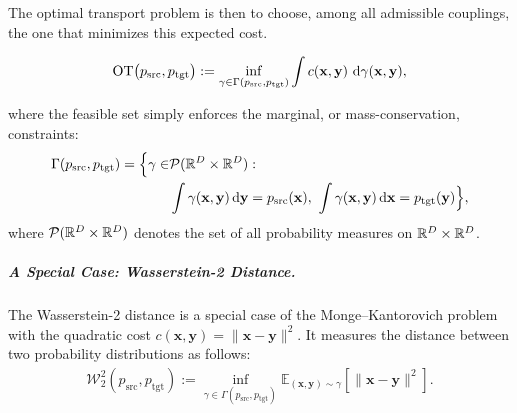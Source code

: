 The optimal transport problem is then to choose, among all admissible couplings,
the one that minimizes this expected cost.
\begin{mdframed}
\begin{equation}\label{eq:ot}
\mathrm{OT}\big(p_{\mathrm{src}},p_{\mathrm{tgt}}\big)
:= \inf_{\gamma\in\Gamma(p_{\mathrm{src}},p_{\mathrm{tgt}})}
\int c({\mathbf{x}},{\mathbf{y}})\,\mathop{}\!\mathrm{d}\gamma({\mathbf{x}},{\mathbf{y}}),
\end{equation}
\end{mdframed}
where the feasible set simply enforces the marginal, or mass-conservation, constraints:
\begin{align*}
    \Gamma(p_{\mathrm{src}},p_{\mathrm{tgt}})
= \Big\{\gamma \in &\mathcal{P}(\mathbb{R}^D\times\mathbb{R}^D): \\
&\int \gamma({\mathbf{x}},{\mathbf{y}}) \mathop{}\!\mathrm{d} {\mathbf{y}} = p_{\mathrm{src}}({\mathbf{x}}),\,\,
\int \gamma({\mathbf{x}},{\mathbf{y}})\mathop{}\!\mathrm{d} {\mathbf{x}} = p_{\mathrm{tgt}}({\mathbf{y}})\Big\},
\end{align*}
where $\mathcal{P}(\mathbb{R}^D\times\mathbb{R}^D)$ denotes the set of all probability measures on
$\mathbb{R}^D\times\mathbb{R}^D$.  


\subparagraph{A Special Case: Wasserstein-2 Distance.}

The Wasserstein-2 distance  is a special case of the Monge--Kantorovich problem with the quadratic cost $c(\mathbf{x}, \mathbf{y}) = \|\mathbf{x} - \mathbf{y}\|^2$. It measures the distance between two probability distributions as follows:
\begin{align*}
 \mathcal{W}_2^2(p_{\mathrm{src}}, p_{\mathrm{tgt}}) := \inf_{\gamma \in \Gamma(p_{\mathrm{src}}, p_{\mathrm{tgt}})} \mathbb{E}_{(\mathbf{x}, \mathbf{y}) \sim \gamma} \left[ \|\mathbf{x} - \mathbf{y}\|^2 \right].
\end{align*}

